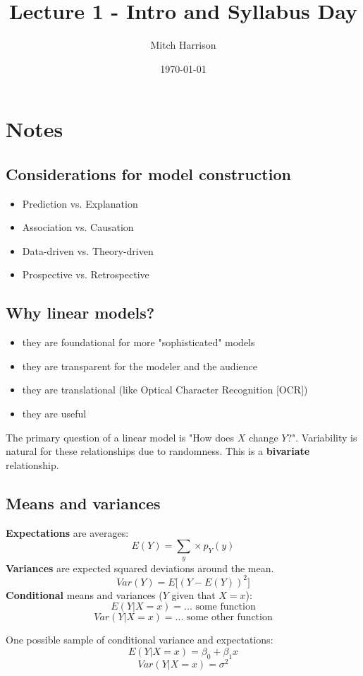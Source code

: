 \documentclass[titlepage, 12pt, leqno]{article}
\title{\Huge{Lecture 1 - Intro and Syllabus Day}}
\author{\large{Mitch Harrison}}
\date{\today}
\begin{document}
\setlength{\parskip}{1\baselineskip}
\setlength{\parindent}{15pt}
\maketitle
\tableofcontents
\newpage


\section{Notes}

\subsection{Considerations for model construction}
\begin{itemize}
    \item Prediction vs. Explanation
    \item Association vs. Causation
    \item Data-driven vs. Theory-driven
    \item Prospective vs. Retrospective
\end{itemize}

\subsection{Why linear models?}
\begin{itemize}
    \item they are foundational for more "sophisticated" models
    \item they are transparent for the modeler and the audience
    \item they are translational (like Optical Character Recognition [OCR])
    \item they are useful
\end{itemize}

\begin{note}
The primary question of a linear model is "How does $X$ change $Y$?". Variability is natural for these relationships due to randomness. This is a \textbf{bivariate} relationship.
\end{note}

\subsection{Means and variances}
\textbf{Expectations} are averages:
\[
E(Y) = \sum_y \times p_Y(y)
\]
\textbf{Variances} are expected squared deviations around the mean.
\[
Var(Y) = E\big[(Y-E(Y))^2\big]
\]
\textbf{Conditional} means and variances ($Y$ given that $X = x$):
\[
E(Y|X = x) = \text{... some function}
\]
\[
Var(Y|X = x) = \text{... some other function}
\]
\begin{ex}
    One possible sample of conditional variance and expectations:
    \[
    E(Y|X = x) = \beta_0 + \beta_1x
    \]
    \[
    Var(Y|X = x) = \sigma^2
    \]
\end{ex}
\end{document}
